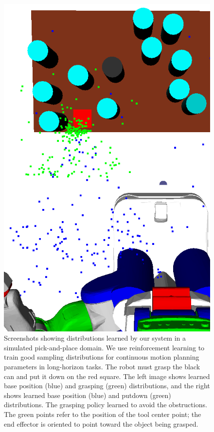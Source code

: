 \begin{figure}[t]
    \includegraphics[scale=0.15]{images/move_putdown.png}
  \caption{\small{Screenshots showing distributions learned by our
      system in a simulated pick-and-place domain. We use
      reinforcement learning to train good sampling distributions for
      continuous motion planning parameters in long-horizon tasks. The
      robot must grasp the black can and put it down on the red
      square. The left image shows learned base position (blue) and
      grasping (green) distributions, and the right shows learned base
      position (blue) and putdown (green) distributions. The grasping
      policy learned to avoid the obstructions. The green points refer
      to the position of the tool center point; the end effector is oriented
      to point toward the object being grasped.}}
  \label{fig:cover}
\end{figure}

